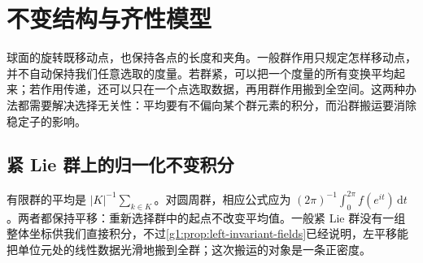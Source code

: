
% 
% 
% 
% 

\section{不变结构与齐性模型}
\label{g1:sec:1703}

球面的旋转既移动点，也保持各点的长度和夹角。一般群作用只规定怎样移动点，并不自动保持我们任意选取的度量。若群紧，可以把一个度量的所有变换平均起来；若作用传递，还可以只在一个点选取数据，再用群作用搬到全空间。这两种办法都需要解决选择无关性：平均要有不偏向某个群元素的积分，而沿群搬运要消除稳定子的影响。

\subsection{紧 Lie 群上的归一化不变积分}
\label{g1:subsec:1703:01}

有限群的平均是 \(|K|^{-1}\sum_{k\in K}\)。对圆周群，相应公式应为 \((2\pi)^{-1}\int_0^{2\pi}f(e^{it})\,\mathrm{d}t\)。两者都保持平移：重新选择群中的起点不改变平均值。一般紧 Lie 群没有一组整体坐标供我们直接积分，不过\cref{g1:prop:left-invariant-fields}已经说明，左平移能把单位元处的线性数据光滑地搬到全群；这次搬运的对象是一条正密度。

